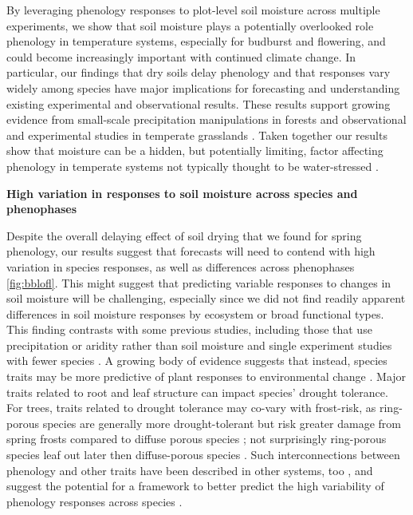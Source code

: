 \documentclass{article}
\begin{document}
\par By leveraging phenology responses to plot-level soil moisture across multiple experiments, we show that soil moisture plays a potentially overlooked role phenology in temperature systems, especially for budburst and flowering, and could become increasingly important with continued climate change. In particular, our findings that dry soils delay phenology and that responses vary widely among species have major implications for forecasting and understanding existing experimental and observational results. These results support growing evidence from small-scale precipitation manipulations in forests \cite[e.g.,][]{currier2022precipitation} and observational and experimental studies in temperate grasslands \citep{liu2022,seyed2018}. Taken together our results show that moisture can be a hidden, but potentially limiting, factor affecting phenology in temperate systems not typically thought to be water-stressed \citep{ettinger2019}.  

\par \textbf {High variation in responses to soil moisture across species and phenophases}

\par Despite the overall delaying effect of soil drying that we found for spring phenology, our results suggest that forecasts will need to contend with high variation in species responses, as well as differences across phenophases \ref{fig:bblofl}. This might suggest that predicting variable responses to changes in soil moisture will be challenging, especially since we did not find readily apparent differences in soil moisture responses by ecosystem or broad functional types. This finding contrasts with some previous studies, including those that use precipitation or aridity rather than soil moisture \citep{sun2026functional} and single experiment studies with fewer species \citep[e.g.,][]{rollinson2012,castillioni2022effects}. A growing body of evidence suggests that instead, species traits may be more predictive of plant responses to environmental change \cite[e.g., ][]{diaz2016global}. Major traits related to root and leaf structure can impact species' drought tolerance. For trees, traits related to drought tolerance may co-vary with frost-risk, as ring-porous species are generally more drought-tolerant but risk greater damage from spring frosts compared to diffuse porous species \citep{bader2022less,wang2022contrast}; not surprisingly ring-porous species leaf out later then diffuse-porous species \cite{lechowicz1984}. Such interconnections between phenology and other traits have been described in other systems, too \citep[e.g.,][]{ocheltree2020identification}, and suggest the potential for a framework to better predict the high variability of phenology responses across species \citep[e.g.,][]{morales2024phylogenetic}.
\end{document}
